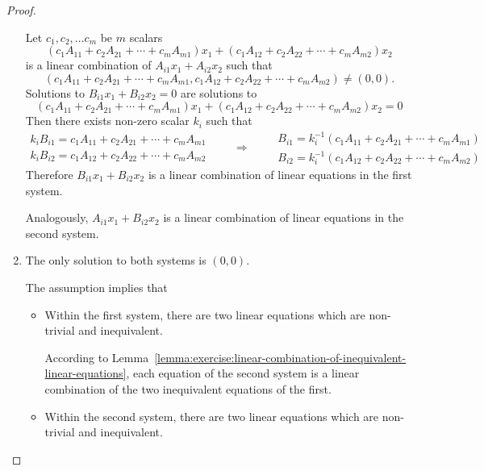 \begin{proof}
\begin{enumerate}[label = \textbf{Case \arabic*.}, itemindent=1cm]
              Let $c_{1}, c_{2}, \ldots c_{m}$ be $m$ scalars
              \[
                  (c_{1}A_{11} + c_{2}A_{21} + \cdots + c_{m}A_{m1})x_{1} + (c_{1}A_{12} + c_{2}A_{22} + \cdots + c_{m}A_{m2})x_{2}
              \]
              is a linear combination of $A_{i1}x_{1} + A_{i2}x_{2}$ such that
              \[
                  (c_{1}A_{11} + c_{2}A_{21} + \cdots + c_{m}A_{m1}, c_{1}A_{12} + c_{2}A_{22} + \cdots + c_{m}A_{m2})\ne (0, 0).
              \]
              Solutions to $B_{i1}x_{1} + B_{i2}x_{2} = 0$ are solutions to
              \[
                  (c_{1}A_{11} + c_{2}A_{21} + \cdots + c_{m}A_{m1})x_{1} + (c_{1}A_{12} + c_{2}A_{22} + \cdots + c_{m}A_{m2})x_{2} = 0
              \]
              Then there exists non-zero scalar $k_{i}$ such that
              \[
                  \begin{split}
                      k_{i}B_{i1} = c_{1}A_{11} + c_{2}A_{21} + \cdots + c_{m}A_{m1} \\
                      k_{i}B_{i2} = c_{1}A_{12} + c_{2}A_{22} + \cdots + c_{m}A_{m2}
                  \end{split}
                  \qquad\Longrightarrow\qquad
                  \begin{split}
                      B_{i1} = k_{i}^{-1}\left(c_{1}A_{11} + c_{2}A_{21} + \cdots + c_{m}A_{m1}\right) \\
                      B_{i2} = k_{i}^{-1}\left(c_{1}A_{12} + c_{2}A_{22} + \cdots + c_{m}A_{m2}\right)
                  \end{split}
              \]
              Therefore $B_{i1}x_{1} + B_{i2}x_{2}$ is a linear combination of linear equations in the first system.

              Analogously, $A_{i1}x_{1} + B_{i2}x_{2}$ is a linear combination of linear equations in the second system.

        \item The only solution to both systems is $(0, 0)$.

              The assumption implies that
              \begin{itemize}
                  \item Within the first system, there are two linear equations which are non-trivial and inequivalent.

                        According to Lemma~\ref{lemma:exercise:linear-combination-of-inequivalent-linear-equations}, each equation of the second system is a linear combination of the two inequivalent equations of the first.
                  \item Within the second system, there are two linear equations which are non-trivial and inequivalent.


\end{itemize}
\end{enumerate}
\end{proof}
